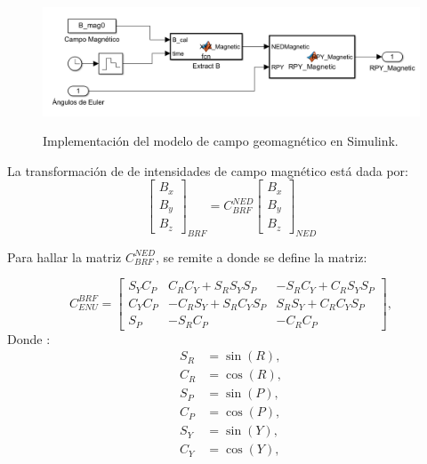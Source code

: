 
\begin{figure}[!ht]
	\begin{center}
		\includegraphics[scale=0.4]{imagenes/modelo_dinamico/modelo_campoMagnetico.PNG}\\
	\end{center}
	\caption{Implementación del modelo de campo geomagnético en Simulink.}
	\label{fig:modeloB}
	\textit{}
\end{figure}

La transformación de de intensidades de campo magnético está dada por: 
\begin{equation}	
	\left[\begin{array}{c}
		B_x\\
		B_y\\
		B_z
	\end{array}\right]_{BRF} = 
	C_{BRF}^{NED}
	\left[\begin{array}{c}
		B_x\\
		B_y\\
		B_z
	\end{array}\right]_{NED}	
\end{equation}

Para hallar la matriz $C_{BRF}^{NED}$, se remite a \cite{grewal2007global} donde se define la matriz:

$$
C_{ENU}^{BRF}=\left[\begin{array}{ccc}
	S_Y C_P & C_R C_Y+S_R S_Y S_P & -S_R C_Y+C_R S_Y S_P \\
	C_Y C_P & -C_R S_Y+S_R C_Y S_P & S_R S_Y+C_R C_Y S_P \\
	S_P & -S_R C_P & -C_R C_P
\end{array}\right],
$$
Donde :
$$
\begin{aligned}
	S_R & =\sin (R), \\
	C_R & =\cos (R), \\
	S_P & =\sin (P), \\
	C_P & =\cos (P), \\
	S_Y & =\sin (Y), \\
	C_Y & =\cos (Y),
\end{aligned}
$$

